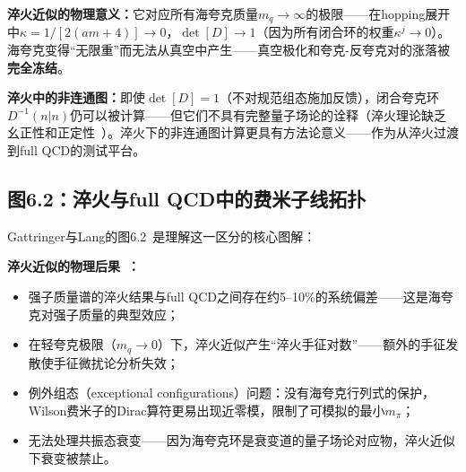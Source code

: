 \documentclass[12pt,a4paper]{ctexart}
\theoremstyle{definition}
\begin{document}
\textbf{淬火近似的物理意义：}它对应所有海夸克质量$m_q \to \infty$的极限——在hopping展开中$\kappa = 1/[2(am+4)] \to 0$，$\det[D] \to 1$（因为所有闭合环的权重$\kappa^j \to 0$）。海夸克变得``无限重''而无法从真空中产生——真空极化和夸克-反夸克对的涨落被\textbf{完全冻结}。

\textbf{淬火中的非连通图：}即使$\det[D] = 1$（不对规范组态施加反馈），闭合夸克环$D^{-1}(n|n)$仍可以被计算——但它们不具有完整量子场论的诠释（淬火理论缺乏幺正性和正定性~\cite{GattringerLang2010}）。淬火下的非连通图计算更具有方法论意义——作为从淬火过渡到full QCD的测试平台。

\subsection{图6.2：淬火与full QCD中的费米子线拓扑}

Gattringer与Lang的图6.2~\cite{GattringerLang2010}是理解这一区分的核心图解：

\begin{center}
\end{center}

\textbf{淬火近似的物理后果~\cite{GattringerLang2010,Gupta1997intro}：}
\begin{itemize}[nosep]
    \item 强子质量谱的淬火结果与full QCD之间存在约5--10\%的系统偏差——这是海夸克对强子质量的典型效应；
    \item 在轻夸克极限（$m_q\to 0$）下，淬火近似产生``淬火手征对数''——额外的手征发散使手征微扰论分析失效；
    \item 例外组态（exceptional configurations）问题：没有海夸克行列式的保护，Wilson费米子的Dirac算符更易出现近零模，限制了可模拟的最小$m_\pi$；
    \item 无法处理共振态衰变——因为海夸克环是衰变道的量子场论对应物，淬火近似下衰变被禁止。
\end{itemize}
\end{document}
